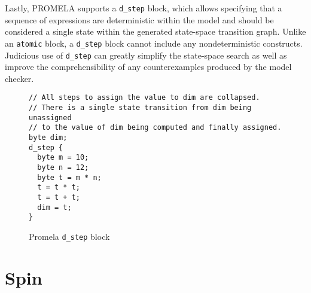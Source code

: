 Lastly, PROMELA supports a \texttt{d\_step} block, which allows specifying that a sequence of expressions are deterministic within the model and should be considered a single state within the generated state-space transition graph.
Unlike an \texttt{atomic} block, a \texttt{d\_step} block cannot include any nondeterministic constructs.
Judicious use of \texttt{d\_step} can greatly simplify the state-space search as well as improve the comprehensibility of any counterexamples produced by the model checker.

\begin{figure}
\centering
\caption{Promela \texttt{d\_step} block}
\begin{verbatim}
// All steps to assign the value to dim are collapsed.
// There is a single state transition from dim being unassigned
// to the value of dim being computed and finally assigned.
byte dim;
d_step {
  byte m = 10;
  byte n = 12;
  byte t = m * n; 
  t = t * t;
  t = t + t;
  dim = t;
}
\end{verbatim}
\end{figure}

\hypertarget{spin}{%
\section{Spin}\label{spin}}


